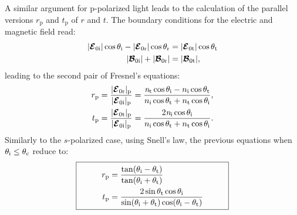 A similar argument for p-polarized light leads to the calculation of the parallel versions $r_\textrm{p}$ and $t_\textrm{p}$ of $r$ and $t$. 
The boundary conditions for the electric and magnetic field read:
\begin{subequations}
\begin{align}
|\boldsymbol{\mathcal{E}}_{0 \textrm{i}}|\cos\theta_{\textrm{i}} - |\boldsymbol{\mathcal{E}}_{0 \textrm{r}}|\cos\theta_{\textrm{r}} &= 
|\boldsymbol{\mathcal{E}}_{0 \textrm{t}}|\cos\theta_{\textrm{t}}\\
|\boldsymbol{\mathcal{B}}_{0 \textrm{i}}| + 
|\boldsymbol{\mathcal{B}}_{0 \textrm{r}}| &= 
|\boldsymbol{\mathcal{B}}_{0 \textrm{t}}|,
\end{align}
\end{subequations}
leading to the second pair of Fresnel's equations:
\begin{equation}\label{Fresnel_parallel}
\begin{split}
r_{\textrm{p}} & = \frac{|\boldsymbol{\mathcal{E}}_{0 \textrm{r}}|_{\textrm{p}}}{|\boldsymbol{\mathcal{E}}_{0\textrm{i}}|_\textrm{p}} = \frac{\textit{n}_\textrm{t}\cos\theta_\textrm{i}-n_\textrm{i} \cos\theta_\textrm{t}}{n_\textrm{i} \cos\theta_\textrm{t}+n_\textrm{t}\cos\theta_\textrm{i}},\\
t_{\textrm{p}} & =\frac{|\boldsymbol{\mathcal{E}}_{0 \textrm{t}}|_{\textrm{p}}}{|\boldsymbol{\mathcal{E}}_{0\textrm{i}}|_\textrm{p}} =  \frac{2\textit{n}_\textrm{i}\cos\theta_\textrm{i}}{n_\textrm{i}\cos\theta_\textrm{t}+n_\textrm{t}\cos\theta_\textrm{i}}.
\end{split}
\end{equation}
Similarly to the $s$-polarized case, using Snell's law, the previous equations when $\theta_\textrm{i}\leq\theta_\textrm{c}$ reduce to:
\begin{equation}
\fbox{\begin{minipage}{18em}
\begin{equation*} \label{simple_Fresnel_p}
\begin{split}
r_{\textrm{p}} & =  \frac{\tan(\myangle_\textrm{i}-\myangle_\textrm{t})}{\tan(\myangle_\textrm{i}+\myangle_\textrm{t})}\\
t_{\textrm{p}} & = \frac{2\sin \myangle_\textrm{t} \cos \myangle_\textrm{i}}{\sin(\myangle_\textrm{i}+\myangle_\textrm{t})\cos(\myangle_\textrm{i}- \myangle_\textrm{t})}
\end{split}
\end{equation*}
\end{minipage}}
\end{equation}
